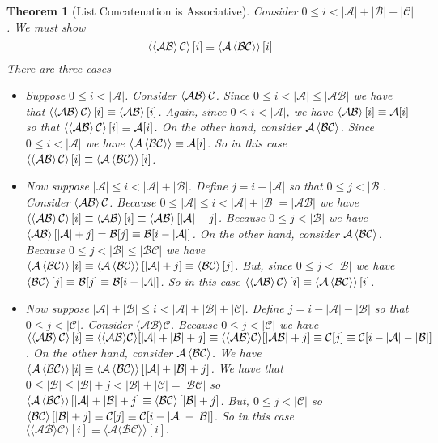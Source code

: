 \documentclass[12pt]{article}
\theoremstyle{break}
\theoremstyle{break}
\newtheorem{theorem}{Theorem}[section]
\theoremstyle{break}
\theoremstyle{break}
\newcommand{\mc}[1]{\mathcal{#1}}
\begin{document}
\begin{theorem}[List Concatenation is Associative]
Consider $0 \le i < |\mc{A}| + |\mc{B}| + |\mc{C}|$.
We must show
$$
\Braket{\Braket{\mc{A}\mc{B}}\mc{C}}[i] \equiv \Braket{\mc{A}\Braket{\mc{B}\mc{C}}}[i]
$$
There are three cases
\begin{itemize}
\item{
Suppose $0 \le i < |\mc{A}|$. 
Consider $\Braket{\mc{A}\mc{B}}\mc{C}$. 
Since $0 \le i < |\mc{A}| \le |\mc{A}\mc{B}|$ we have that $\Braket{\Braket{\mc{A}\mc{B}}\mc{C}}[i] \equiv \Braket{\mc{A}\mc{B}}[i]$. 
Again, since $0\le i < |\mc{A}|$, we have $\Braket{\mc{A}\mc{B}}[i] \equiv \mc{A}[i]$ so that $\Braket{\Braket{\mc{A}\mc{B}}\mc{C}}[i] \equiv \mc{A}[i]$. 
On the other hand, consider $\mc{A}\Braket{\mc{B}\mc{C}}$. 
Since $0 \le i < |\mc{A}|$ we have $\Braket{\mc{A}\Braket{\mc{B}\mc{C}}} \equiv \mc{A}[i]$. 
So in this case $\Braket{\Braket{\mc{A}\mc{B}}\mc{C}}[i] \equiv \Braket{\mc{A}\Braket{\mc{B}\mc{C}}}[i]$.
}
\item{
Now suppose $|\mc{A}| \le i < |\mc{A}| + |\mc{B}|$. 
Define $j = i - |\mc{A}|$ so that $0 \le j < |\mc{B}|$. 
Consider $\Braket{\mc{A}\mc{B}}\mc{C}$. 
Because $0 \le |\mc{A}| \le i < |\mc{A}| + |\mc{B}| = |\mc{A}\mc{B}|$ we have $\Braket{\Braket{\mc{A}\mc{B}}\mc{C}}[i] \equiv \Braket{\mc{A}\mc{B}}[i] \equiv \Braket{\mc{A}\mc{B}}[|\mc{A}| + j]$. Because $0 \le j < |\mc{B}|$ we have $\Braket{\mc{A}\mc{B}}[|\mc{A}|+j] = \mc{B}[j] \equiv \mc{B}[i - |\mc{A}|]$. 
On the other hand, consider $\mc{A}\Braket{\mc{B}\mc{C}}$. 
Because $0 \le j < |\mc{B}| \le |\mc{B}\mc{C}|$ we have $\Braket{\mc{A}\Braket{\mc{B}\mc{C}}}[i] \equiv \Braket{\mc{A}\Braket{\mc{B}\mc{C}}}[|\mc{A}| + j] \equiv \Braket{\mc{B}\mc{C}}[j]$. But, since $0 \le j < |\mc{B}|$ we have $\Braket{\mc{B}\mc{C}}[j] \equiv \mc{B}[j] \equiv \mc{B}[i - |\mc{A}|]$. So in this case $\Braket{\Braket{\mc{A}\mc{B}}\mc{C}}[i] \equiv \Braket{\mc{A}\Braket{\mc{B}\mc{C}}}[i]$.
}
\item{
Now suppose $|\mc{A}| + |\mc{B}| \le i < |\mc{A}| + |\mc{B}| + |\mc{C}|$. 
Define $j = i - |\mc{A}| - |\mc{B}|$ so that $0 \le j < |\mc{C}|$. Consider $\langle\mc{A}\mc{B}\rangle\mc{C}$. 
Because $0 \le j < |\mc{C}|$ we have $\Braket{\Braket{\mc{A}\mc{B}}\mc{C}}[i] \equiv \langle\langle\mc{A}\mc{B}\rangle\mc{C}\rangle[|\mc{A}| + |\mc{B}| + j] \equiv \langle\langle\mc{A}\mc{B}\rangle\mc{C}\rangle[|\mc{A}\mc{B}| + j] \equiv \mc{C}[j] \equiv \mc{C}[i - |\mc{A}| - |\mc{B}|]$. 
On the other hand, consider $\mc{A}\Braket{\mc{B}\mc{C}}$. 
We have $\Braket{\mc{A}\Braket{\mc{B}\mc{C}}}[i] \equiv \Braket{\mc{A}\Braket{\mc{B}\mc{C}}}[|\mc{A}| + |\mc{B}| + j]$.
We have that $0 \le |\mc{B}| \le |\mc{B}| + j < |\mc{B}| + |\mc{C}| = |\mc{B}\mc{C}|$ so $\Braket{\mc{A}\Braket{\mc{B}\mc{C}}}[|\mc{A}| + |\mc{B}| + j] \equiv \Braket{\mc{B}\mc{C}}[|\mc{B}| + j]$. 
But, $0 \le j < |\mc{C}|$ so $\Braket{\mc{B}\mc{C}}[|\mc{B}|+j] \equiv \mc{C}[j] \equiv \mc{C}[i - |\mc{A}|-|\mc{B}|]$. 
So in this case $\langle\langle\mc{A}\mc{B}\rangle\mc{C}\rangle[i] \equiv \langle\mc{A}\langle\mc{B}\mc{C}\rangle\rangle[i].$
}


\end{itemize}
\end{theorem}
\end{document}

